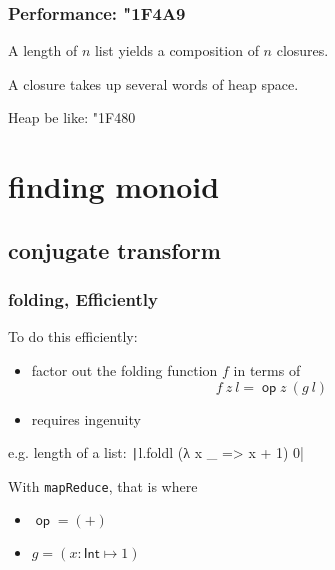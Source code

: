 \documentclass{beamer}
\DeclareMathOperator{\op}{\mathsf{op}}
\begin{document}
\begin{frame}
    \frametitle{Performance: {\char"1F4A9}}
    A length of $n$ list yields a composition of $n$ closures.

    A closure takes up several words of heap space.

    Heap be like: {\char"1F480}

\end{frame}
\section{finding monoid}
\subsection{conjugate transform}
\begin{frame}
    \frametitle{folding, Efficiently}
    To do this efficiently:
    \begin{itemize}
        \item factor out the folding function $f$ in terms of
              \begin{equation*}
                  f\ z\ l = \op z\ (g\ l)
              \end{equation*}
        \item requires ingenuity
    \end{itemize}
    e.g. length of a list: \texttt|l.foldl (λ x _ => x + 1) 0|

    With \texttt{mapReduce}, that is
    where
    \begin{itemize}
        \item $\op = (+)$
        \item $g = (x: \mathsf{Int}\mapsto 1)$
    \end{itemize}
\end{frame}
\end{document}
